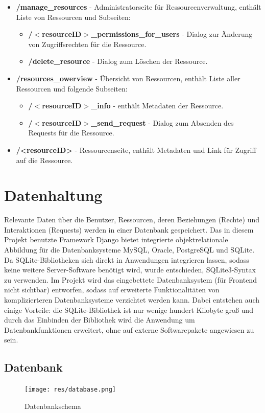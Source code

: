 \documentclass[parskip=full,11pt]{scrartcl}
\begin{document}
\begin{itemize}[itemsep=0pt]
\item \textbf{/manage{\_}resources} - Administratorseite für Ressourcenverwaltung, enthält Liste von Ressourcen und Subseiten:
\begin{itemize}[itemsep=0pt]
\item \textbf{/$<$resourceID$>${\_}permissions{\_}for{\_}users} - Dialog zur Änderung von Zugriffsrechten für die Ressource. 
\item \textbf{/delete{\_}resource} - Dialog zum Löschen der Ressource.
\end{itemize}
\item \textbf{/resources{\_}owerview} - Übersicht von Ressourcen, enthält Liste aller Ressourcen und folgende Subseiten:
\begin{itemize}[itemsep=0pt]
\item \textbf{/$<$resourceID$>${\_}info} - enthält Metadaten der Ressource.
\item \textbf{/$<$resourceID$>${\_}send{\_}request} - Dialog zum Absenden des Requests für die Ressource.
\end{itemize}
\item \textbf{/<resourceID>} - Ressourcenseite, enthält Metadaten und Link für Zugriff auf die Ressource.
\end{itemize} 

 
 \newpage
 \section{Datenhaltung}
 
Relevante Daten über die Benutzer, Ressourcen, deren Beziehungen (Rechte) und Interaktionen (Requests) werden in einer Datenbank gespeichert. Das in diesem Projekt benutzte Framework Django bietet integrierte  objektrelationale Abbildung für die Datenbanksysteme MySQL, Oracle, PostgreSQL und SQLite.\\
Da SQLite-Bibliotheken sich direkt in Anwendungen integrieren lassen, sodass keine weitere Server-Software benötigt wird, wurde entschieden, SQLite3-Syntax zu verwenden. Im Projekt wird das eingebettete Datenbanksystem (für Frontend nicht sichtbar) entworfen, sodass auf erweiterte Funktionalitäten von komplizierteren Datenbanksysteme verzichtet werden kann. Dabei entstehen auch einige Vorteile: die SQLite-Bibliothek ist nur wenige hundert Kilobyte groß und durch das Einbinden der Bibliothek wird die Anwendung um Datenbankfunktionen erweitert, ohne auf externe Softwarepakete angewiesen zu sein.
 \subsection{Datenbank}
 \begin{figure}[ht!]
 	\centering
 	\texttt{[image: res/database.png]}
 	\caption{Datenbankschema}
 \end{figure}
 \newpage
 
\end{document}
